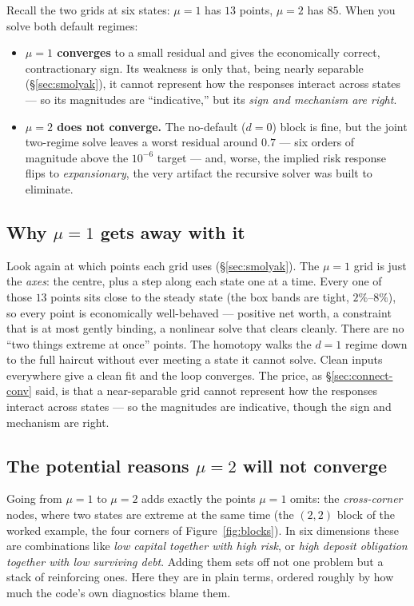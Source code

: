 \documentclass[11pt]{article}
\begin{document}
Recall the two grids at six states: $\mu=1$ has $13$ points, $\mu=2$ has
$85$. When you solve both default regimes:

\begin{itemize}
\item \textbf{$\mu=1$ converges} to a small residual and gives the
      economically correct, contractionary sign. Its weakness is only that,
      being nearly separable (\S\ref{sec:smolyak}), it cannot represent how
      the responses interact across states --- so its magnitudes are
      ``indicative,'' but its \emph{sign and mechanism are right}.
\item \textbf{$\mu=2$ does not converge.} The no-default ($d=0$) block is
      fine, but the joint two-regime solve leaves a worst residual around
      $0.7$ --- six orders of magnitude above the $10^{-6}$ target --- and,
      worse, the implied risk response flips to \emph{expansionary}, the very
      artifact the recursive solver was built to eliminate.
\end{itemize}

\subsection{Why $\mu=1$ gets away with it}

Look again at which points each grid uses (\S\ref{sec:smolyak}). The $\mu=1$
grid is just the \emph{axes}: the centre, plus a step along each state one at
a time. Every one of those $13$ points sits close to the steady state (the
box bands are tight, $2\%$--$8\%$), so every point is economically
well-behaved --- positive net worth, a constraint that is at most gently
binding, a nonlinear solve that clears cleanly. There are no ``two things
extreme at once'' points. The homotopy walks the $d=1$ regime down to the
full haircut without ever meeting a state it cannot solve. Clean inputs
everywhere give a clean fit and the loop converges. The price, as
\S\ref{sec:connect-conv} said, is that a near-separable grid cannot represent
how the responses interact across states --- so the magnitudes are
indicative, though the sign and mechanism are right.

\subsection{The potential reasons $\mu=2$ will not converge}
\label{sec:mu2-reasons}

Going from $\mu=1$ to $\mu=2$ adds exactly the points $\mu=1$ omits: the
\emph{cross-corner} nodes, where two states are extreme at the same time (the
$(2,2)$ block of the worked example, the four corners of
Figure~\ref{fig:blocks}). In six dimensions these are combinations like
\emph{low capital together with high risk}, or \emph{high deposit obligation
together with low surviving debt}. Adding them sets off not one problem but a
stack of reinforcing ones. Here they are in plain terms, ordered roughly by
how much the code's own diagnostics blame them.
\end{document}

